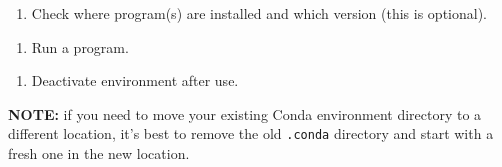 \documentclass[
]{book}
\newenvironment{Shaded}{\begin{snugshade}}{\end{snugshade}}
\newcommand{\NormalTok}[1]{#1}
\newcommand{\OperatorTok}[1]{\textcolor[rgb]{0.81,0.36,0.00}{\textbf{#1}}}
\newcommand{\StringTok}[1]{\textcolor[rgb]{0.31,0.60,0.02}{#1}}
\providecommand{\tightlist}{%
  \setlength{\itemsep}{0pt}\setlength{\parskip}{0pt}}
\begin{document}
\begin{Shaded}
\end{Shaded}

\begin{enumerate}
\def\labelenumi{\arabic{enumi}.}
\setcounter{enumi}{10}
\tightlist
\item
  Check where program(s) are installed and which version (this is optional).
\end{enumerate}

\begin{Shaded}
\end{Shaded}

\begin{enumerate}
\def\labelenumi{\arabic{enumi}.}
\setcounter{enumi}{11}
\tightlist
\item
  Run a program.
\end{enumerate}

\begin{Shaded}
\end{Shaded}

\begin{enumerate}
\def\labelenumi{\arabic{enumi}.}
\setcounter{enumi}{12}
\tightlist
\item
  Deactivate environment after use.
\end{enumerate}

\begin{Shaded}
\end{Shaded}

\textbf{NOTE:} if you need to move your existing Conda environment directory to a different location, it's best to remove the old \texttt{.conda} directory and start with a fresh one in the new location.
\end{document}
